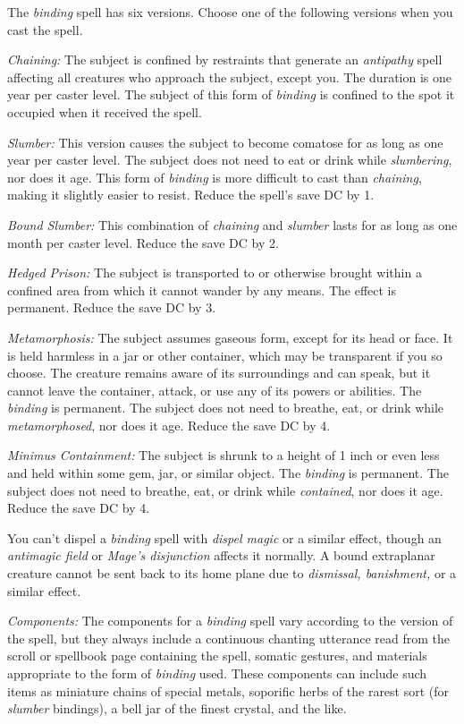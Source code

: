\documentclass{article}
\begin{document}
The \textit{binding }spell has six versions. Choose one of the following versions 
when you cast the spell.

\textit{Chaining: }The subject is confined by restraints that generate an \textit{antipathy 
}spell affecting all creatures who approach the subject, except you. The duration 
is one year per caster level. The subject of this form of \textit{binding }is confined 
to the spot it occupied when it received the spell.

\textit{Slumber: }This version causes the subject to become comatose for as long 
as one year per caster level. The subject does not need to eat or drink while \textit{slumbering}, 
nor does it age. This form of \textit{binding }is more difficult to cast than \textit{chaining}, 
making it slightly easier to resist. Reduce the spell's save DC by 1.

\textit{Bound Slumber: }This combination of \textit{chaining }and \textit{slumber 
}lasts for as long as one month per caster level. Reduce the save DC by 2.

\textit{Hedged Prison: }The subject is transported to or otherwise brought within 
a confined area from which it cannot wander by any means. The effect is permanent. 
Reduce the save DC by 3.

\textit{Metamorphosis: }The subject assumes gaseous form, except for its head or 
face. It is held harmless in a jar or other container, which may be transparent 
if you so choose. The creature remains aware of its surroundings and can speak, 
but it cannot leave the container, attack, or use any of its powers or abilities. 
The \textit{binding }is permanent. The subject does not need to breathe, eat, or 
drink while \textit{metamorphosed}, nor does it age. Reduce the save DC by 4.

\textit{Minimus Containment: }The subject is shrunk to a height of 1 inch or even 
less and held within some gem, jar, or similar object. The \textit{binding }is 
permanent. The subject does not need to breathe, eat, or drink while \textit{contained}, 
nor does it age. Reduce the save DC by 4.

You can't dispel a \textit{binding }spell with \textit{dispel magic }or a similar 
effect, though an \textit{antimagic field }or \textit{Mage's disjunction }affects 
it normally. A bound extraplanar creature cannot be sent back to its home plane 
due to \textit{dismissal, banishment, }or a similar effect.

\textit{Components: }The components for a \textit{binding }spell vary according 
to the version of the spell, but they always include a continuous chanting utterance 
read from the scroll or spellbook page containing the spell, somatic gestures, 
and materials appropriate to the form of \textit{binding }used. These components 
can include such items as miniature chains of special metals, soporific herbs of 
the rarest sort (for \textit{slumber }bindings), a bell jar of the finest crystal, 
and the like.
\end{document}
